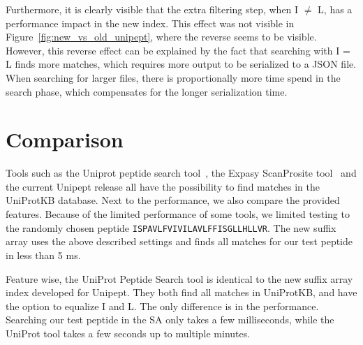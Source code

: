 \documentclass[11pt]{article}
\newenvironment{Figure}
{\par\medskip\noindent\minipage{\linewidth}}
{\endminipage\par\medskip}
\begin{document}
\begin{multicols}{2}
        Furthermore, it is clearly visible that the extra filtering step, when I $\neq$ L, has a performance impact in the new index.
        This effect was not visible in Figure~\ref{fig:new_vs_old_unipept}, where the reverse seems to be visible.
        However, this reverse effect can be explained by the fact that searching with I = L finds more matches, which requires more output to be serialized to a JSON file.
        When searching for larger files, there is proportionally more time spend in the search phase, which compensates for the longer serialization time.

        \begin{Figure}
            \centering
            \label{fig:new_vs_old_unipept_tryptic}
        \end{Figure}


        \section{Comparison}\label{sec:comparison}
        Tools such as the Uniprot peptide search tool~\cite{uniprot_search_site, uniprot_search_paper}, the Expasy ScanProsite tool~\cite{scanprosite} and the current Unipept release all have the possibility to find matches in the UniProtKB database.
        Next to the performance, we also compare the provided features.
        Because of the limited performance of some tools, we limited testing to the randomly chosen peptide \texttt{ISPAVLFVIVILAVLFFISGLLHLLVR}.
        The new suffix array uses the above described settings and finds all matches for our test peptide in less than 5 ms.

        Feature wise, the UniProt Peptide Search tool is identical to the new suffix array index developed for Unipept.
        They both find all matches in UniProtKB, and have the option to equalize I and L\@.
        The only difference is in the performance.
        Searching our test peptide in the SA only takes a few milliseconds, while the UniProt tool takes a few seconds up to multiple minutes.


\end{multicols}
\end{document}
